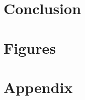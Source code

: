\documentclass[journal, twocolumn, final,11pt,letterpaper]{IEEEtran}
\begin{document}
\section{Conclusion}

\clearpage
\onecolumn
\section{Figures}



     

\section*{Appendix}
%
\end{document}
